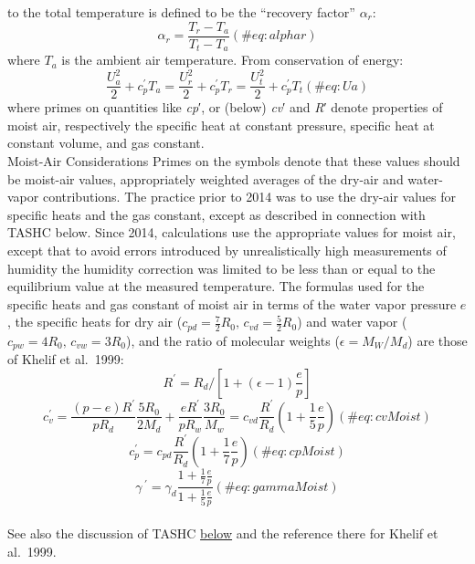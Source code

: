\documentclass[
  english,
]{book}
\begin{document}
to the total temperature is defined to be the ``recovery factor''
\(\alpha_r\): \begin{equation}
\alpha_{r}=\frac{T_{r}-T_{a}}{T_{t}-T_{a}}
(\#eq:alphar)
\end{equation} where \(T_a\) is the ambient air temperature. From
conservation of energy:\\
\begin{equation}
\frac{U_{a}^{2}}{2}+c_{p}^{\prime}T_{a}=\frac{U_{r}^{2}}{2}+c_{p}^{\prime}T_{r}=\frac{U_{t}^{2}}{2}+c_{p}^{\prime}T_{t}
(\#eq:Ua)
\end{equation} where primes on quantities like {\emph{c}\emph{p}′}, or
(below) {\emph{c}\emph{v}′} and {\emph{R}′} denote properties of moist
air, respectively the specific heat at constant pressure, specific heat
at constant volume, and gas constant.\\

Moist-Air Considerations Primes on the symbols denote that these values
should be moist-air values, appropriately weighted averages of the
dry-air and water-vapor contributions. The practice prior to 2014 was to
use the dry-air values for specific heats and the gas constant, except
as described in connection with TASHC below. Since 2014, calculations
use the appropriate values for moist air, except that to avoid errors
introduced by unrealistically high measurements of humidity the humidity
correction was limited to be less than or equal to the equilibrium value
at the measured temperature. The formulas used for the specific heats
and gas constant of moist air in terms of the water vapor pressure
\(e\), the specific heats for dry air
(\(c_{pd}=\frac{7}{2}R_{0},\,c_{vd}=\frac{5}{2}R_{0}\)) and water vapor
(\(c_{pw}=4R_{0},\,c_{vw}=3R_{0}\)), and the ratio of molecular weights
(\(\epsilon=M_{W}/M_{d}\)) are those of Khelif et al.~1999:\\
\begin{equation}
R^{\prime}=R_{d}/[1+(\epsilon-1)\frac{e}{p}]
\end{equation} \begin{equation}
c_{v}^{\prime} = \frac{(p-e)R^{\prime}}{pR_{d}}\frac{5R_{0}}{2M_{d}}+\frac{eR^{\prime}}{pR_{w}}\frac{3R_{0}}{M_{w}}=c_{vd}\frac{R^{\prime}}{R_{d}}\left(1+\frac{1}{5}\frac{e}{p}\right)
(\#eq:cvMoist)
\end{equation} \begin{equation}
c_{p}^{\prime} = c_{pd}\frac{R^{\prime}}{R_{d}}\left(1+\frac{1}{7}\frac{e}{p}\right)
(\#eq:cpMoist)
\end{equation} \begin{equation}
\gamma\,^{\prime} = \gamma_{d}\frac{1+\frac{1}{7}\frac{e}{p}}{1+\frac{1}{5}\frac{e}{p}}
(\#eq:gammaMoist)
\end{equation}\\
See also the discussion of TASHC \protect\hyperlink{tashc}{below} and
the reference there for Khelif et al.~1999.
\end{document}
